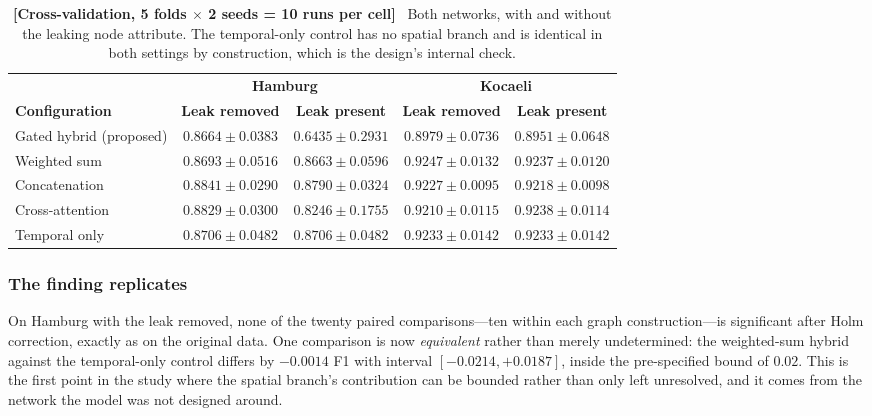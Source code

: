 \documentclass[journal]{IEEEtran}
\begin{document}
\begin{table}[!t]
  \centering
  \caption{\textbf{[Cross-validation, 5 folds $\times$ 2 seeds = 10 runs per
  cell]}~ Both networks, with and without the leaking node attribute. The
  temporal-only control has no spatial branch and is identical in both
  settings by construction, which is the design's internal check.}
  \label{tab:independent_network}
  \renewcommand{\arraystretch}{1.2}
  \footnotesize
  \begin{tabular}{@{}lcccc@{}}
    \toprule
    & \multicolumn{2}{c}{\textbf{Hamburg}} & \multicolumn{2}{c}{\textbf{Kocaeli}} \\
    \cmidrule(lr){2-3}\cmidrule(lr){4-5}
    \textbf{Configuration} & \textbf{Leak removed} & \textbf{Leak present}
    & \textbf{Leak removed} & \textbf{Leak present} \\ \midrule
    Gated hybrid (proposed) & $0.8664 \pm 0.0383$ & $0.6435 \pm 0.2931$ & $0.8979 \pm 0.0736$ & $0.8951 \pm 0.0648$ \\
    Weighted sum & $0.8693 \pm 0.0516$ & $0.8663 \pm 0.0596$ & $0.9247 \pm 0.0132$ & $0.9237 \pm 0.0120$ \\
    Concatenation & $0.8841 \pm 0.0290$ & $0.8790 \pm 0.0324$ & $0.9227 \pm 0.0095$ & $0.9218 \pm 0.0098$ \\
    Cross-attention & $0.8829 \pm 0.0300$ & $0.8246 \pm 0.1755$ & $0.9210 \pm 0.0115$ & $0.9238 \pm 0.0114$ \\
    Temporal only & $0.8706 \pm 0.0482$ & $0.8706 \pm 0.0482$ & $0.9233 \pm 0.0142$ & $0.9233 \pm 0.0142$ \\
    \bottomrule
  \end{tabular}
\end{table}

\subsubsection{The finding replicates}
On Hamburg with the leak removed, none of the twenty paired comparisons---ten
within each graph construction---is significant after Holm correction, exactly
as on the original data. One comparison is now \emph{equivalent} rather than
merely undetermined: the weighted-sum hybrid against the temporal-only
control differs by $-0.0014$ F1 with interval $[-0.0214, +0.0187]$, inside the
pre-specified bound of $0.02$. This is the first point in the study where the
spatial branch's contribution can be bounded rather than only left
unresolved, and it comes from the network the model was not designed around.
\end{document}
